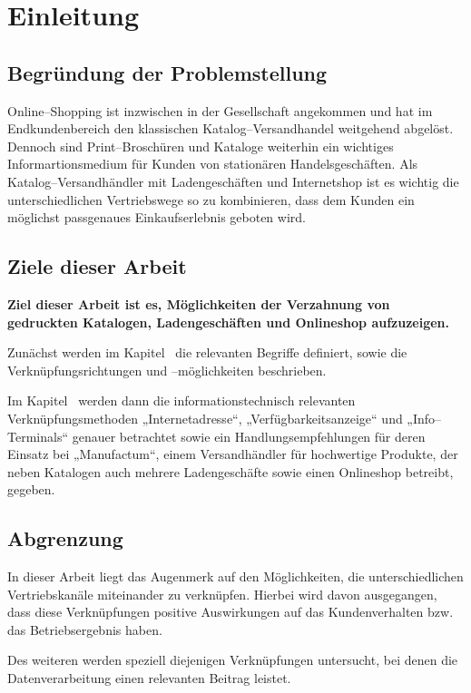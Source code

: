 \section{Einleitung}
\label{sec:einleitung}

\subsection{Begründung der Problemstellung}

Online--Shopping ist inzwischen in der Gesellschaft angekommen und hat im Endkundenbereich den klassischen Katalog--Versandhandel weitgehend abgelöst. Dennoch sind Print--Broschüren und Kataloge weiterhin ein wichtiges Informartionsmedium für Kunden von stationären Handelsgeschäften. Als Katalog--Versand\-händler mit Ladengeschäften und Internetshop ist es wichtig die unterschiedlichen Vertriebswege so zu kombinieren, dass dem Kunden ein möglichst passgenaues Einkaufserlebnis geboten wird.

\subsection{Ziele dieser Arbeit}

\textbf{Ziel dieser Arbeit ist es, Möglichkeiten der Verzahnung von gedruckten Katalogen, Ladengeschäften und Onlineshop aufzuzeigen.}

Zunächst werden im Kapitel~ die relevanten Begriffe definiert, sowie die Verknüpfungsrichtungen und --möglichkeiten beschrieben.

Im Kapitel~ werden dann die informationstechnisch relevanten Verknüpfungsmethoden „Internetadresse“, „Verfügbarkeitsanzeige“ und „Info--Ter\-mi\-nals“ genauer betrachtet sowie ein Handlungsempfehlungen für deren Einsatz bei „Manufactum“, einem Versandhändler für hochwertige Produkte, der neben Katalogen auch mehrere Ladengeschäfte sowie einen Onlineshop betreibt, gegeben.

\subsection{Abgrenzung}

In dieser Arbeit liegt das Augenmerk auf den Möglichkeiten, die unterschiedlichen Vertriebskanäle miteinander zu verknüpfen. Hierbei wird davon ausgegangen, dass diese Verknüpfungen positive Auswirkungen auf das Kundenverhalten bzw. das Betriebsergebnis haben. 

Des weiteren werden speziell diejenigen Verknüpfungen untersucht, bei denen die Datenverarbeitung einen relevanten Beitrag leistet.

